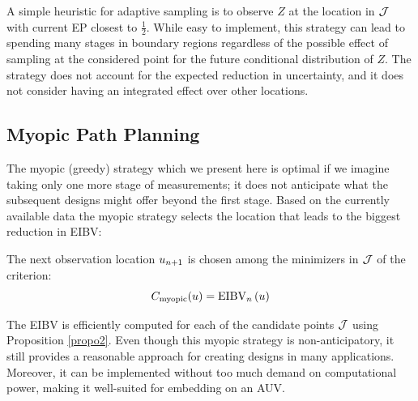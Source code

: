 \documentclass[aoas,preprint]{imsart}
\begin{document}
A simple heuristic for adaptive sampling is to observe $Z$ at the
location in $\mathcal{J}$ with current EP closest to
$\frac{1}{2}$. While easy to implement, this strategy can lead to
spending many stages in boundary regions regardless of the possible
effect of sampling at the considered point for the future conditional
distribution of $Z$. The strategy does not account for the expected
reduction in uncertainty, and it does not consider having an
integrated effect over other locations.


\subsection{Myopic Path Planning}
\label{sec:myopic}

The myopic (greedy) strategy which we present here is optimal if we
imagine taking only one more stage of measurements; it does not
anticipate what the subsequent designs might offer beyond the first
stage.  Based on the currently available data the myopic strategy
selects the location that leads to the biggest reduction in EIBV:
\begin{criterion}[Myopic]
The next observation location $u_{n + 1}$ is chosen among
the minimizers in $\mathcal{J}$ of the criterion: 
\begin{equation}\label{critSEQ}
     C_{\text{myopic}}(u) = \EIBV_{\stage}\left(\spatloc\right)
\end{equation}
\end{criterion}

The EIBV is efficiently computed for each of the candidate points
$\mathcal{J}$ using Proposition \ref{propo2}. 
Even though this myopic strategy is non-anticipatory, it still
provides a reasonable approach for creating designs in many
applications. Moreover, it can be implemented without too much demand on
computational power, making it well-suited for embedding on an AUV.
\end{document}
